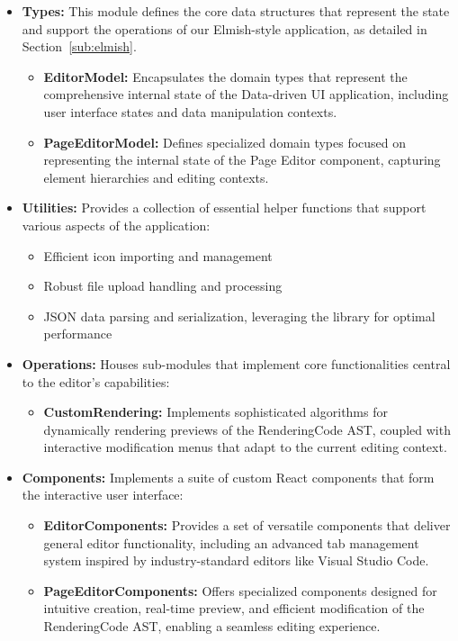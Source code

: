 \begin{itemize}
	\item \textbf{Types:} This module defines the core data structures that represent the state and support the operations of our Elmish-style application, as detailed in Section~\ref{sub:elmish}.
	      \begin{itemize}
		      \item \textbf{EditorModel:} Encapsulates the domain types that represent the comprehensive internal state of the Data-driven UI application, including user interface states and data manipulation contexts.
		      \item \textbf{PageEditorModel:} Defines specialized domain types focused on representing the internal state of the Page Editor component, capturing element hierarchies and editing contexts.
	      \end{itemize}

	\item \textbf{Utilities:} Provides a collection of essential helper functions that support various aspects of the application:
	      \begin{itemize}
		      \item Efficient icon importing and management
		      \item Robust file upload handling and processing
		      \item JSON data parsing and serialization, leveraging the \citet{simpleJson} library for optimal performance
	      \end{itemize}

	\item \textbf{Operations:} Houses sub-modules that implement core functionalities central to the editor's capabilities:
	      \begin{itemize}
		      \item \textbf{CustomRendering:} Implements sophisticated algorithms for dynamically rendering previews of the RenderingCode AST, coupled with interactive modification menus that adapt to the current editing context.
	      \end{itemize}

	\item \textbf{Components:} Implements a suite of custom React components that form the interactive user interface:
	      \begin{itemize}
		      \item \textbf{EditorComponents:} Provides a set of versatile components that deliver general editor functionality, including an advanced tab management system inspired by industry-standard editors like Visual Studio Code.
		      \item \textbf{PageEditorComponents:} Offers specialized components designed for intuitive creation, real-time preview, and efficient modification of the RenderingCode AST, enabling a seamless editing experience.
	      \end{itemize}
\end{itemize}

